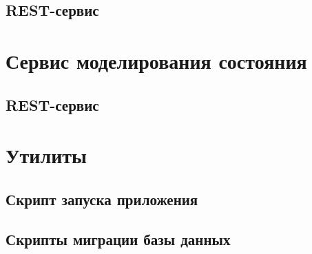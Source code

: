 \subsection{REST-сервис}

% 

\section{Сервис моделирования состояния}

\subsection{REST-сервис}

% 

\section{Утилиты}

\subsection{Скрипт запуска приложения}

% 

\subsection{Скрипты миграции базы данных}

% 

% 

% 

% 

